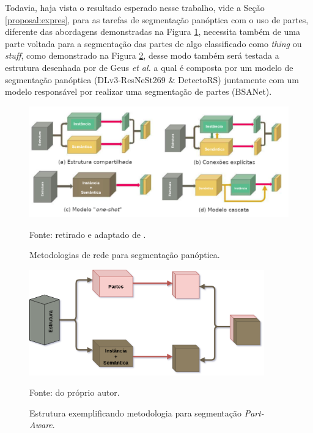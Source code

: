 Todavia, haja vista o resultado esperado nesse trabalho, vide a Seção \ref{proposal:expres}, para as tarefas de segmentação panóptica com o uso de partes, diferente das abordagens demonstradas na Figura \ref{proposal:method:fig:1}, necessita também de uma parte voltada para a segmentação das partes de algo classificado como \textit{thing} ou \textit{stuff}, como demonstrado na Figura \ref{proposal:method:fig:2}, desse modo também será testada a estrutura desenhada por de Geus \textit{et al.} \cite{DeGeus2021} a qual é composta por um modelo de segmentação panóptica (DLv3-ResNeSt269 \& DetectoRS) juntamente com um modelo responsável por realizar uma segmentação de partes (BSANet).

\begin{figure}[H]
    \centering
    \caption{Metodologias de rede para segmentação panóptica.}
    \includegraphics[width=1\textwidth]{recursos/imagens/proposal/model_methodologies.png}
    \label{proposal:method:fig:1}

    \vspace*{1 cm}
    Fonte: retirado e adaptado de \cite{Elharrouss2021PanopticReview}.
\end{figure}

\begin{figure}[H]
    \centering
    \caption{Estrutura exemplificando metodologia para segmentação \textit{Part-Aware}.}
    \includegraphics[width=4in]{recursos/imagens/proposal/estrutura.png}
    \label{proposal:method:fig:2}

    \vspace*{1 cm}
    Fonte: do próprio autor.
\end{figure}


